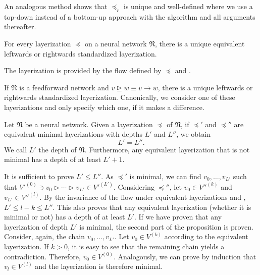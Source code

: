 \documentclass[a4paper,11pt]{report}
\begin{document}
\begin{Bew}
An analogous method shows that $\preceq_r$ is unique and well-defined where we use a top-down instead of a bottom-up approach with the algorithm and all arguments thereafter.
\end{Bew}

\begin{Cor}
For every layerization $\preceq$ on a neural network $\mathfrak{N}$, there is a unique equivalent leftwards or rightwards standardized layerization.
\end{Cor}

\begin{Bew}
The layerization is provided by the flow defined by $\preceq$ and .
\end{Bew}

\begin{Cor}\label{cor:standardized-layerization-feedforward}
If $\mathfrak{N}$ is a feedforward network and $v\trianglerighteq w\equiv v\to w$, there is a unique leftwards or rightwards standardized layerization. Canonically, we consider one of these layerizations and only specify which one, if it makes a difference.
\end{Cor}

\begin{Pro}
Let $\mathfrak{N}$ be a neural network. Given a layerization $\preceq$ of $\mathfrak{N}$, if $\preceq'$ and $\preceq''$ are equivalent minimal layerizations with depths $L'$ and $L''$, we obtain 
\[
L'=L''.
\]
We call $L'$ the depth of $\mathfrak{N}$. Furthermore, any equivalent layerization that is not minimal has a depth of at least $L'+1$.
\end{Pro}

\begin{Bew}
It is sufficient to prove $L'\le L''$. As $\preceq'$ is minimal, we can find $v_0,\dotsc,v_{L'}$ such that $V'^{(0)}\ni v_0\triangleright\dotsb\triangleright v_{L'}\in V'^{(L')}$. Considering $\preceq''$, let $v_0\in {V''}^{(k)}$ and $v_{L'}\in {V''}^{(l)}$. By the invariance of the flow under equivalent layerizations and , $L'\le l-k\le L''$. This also proves that any equivalent layerization (whether it is minimal or not) has a depth of at least $L'$. If we have proven that any layerization of depth $L'$ is minimal, the second part of the proposition is proven. Consider, again, the chain $v_0,\dotsc, v_{L'}$. Let $v_0\in V^{(k)}$ according to the equivalent layerization. If $k>0$, it is easy to see that the remaining chain yields a contradiction. Therefore, $v_0\in V^{(0)}$. Analogously, we can prove by induction that $v_l\in V^{(l)}$ and the layerization is therefore minimal.
\end{Bew}
\end{document}
